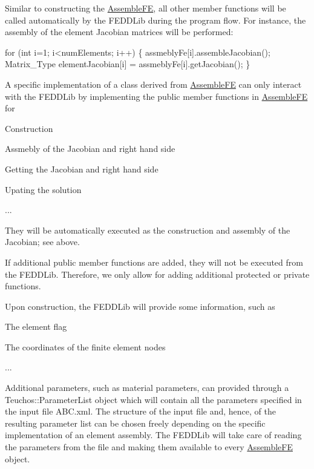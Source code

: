Similar to constructing the \hyperlink{classFEDD_1_1AssembleFE}{Assemble\+FE}, all other member functions will be called automatically by the F\+E\+D\+D\+Lib during the program flow. For instance, the assembly of the element Jacobian matrices will be performed\+: 
\begin{DoxyCode}
\textcolor{keywordflow}{for} (\textcolor{keywordtype}{int} i=1; i<numElements; i++) \{
    assmeblyFe[i].assembleJacobian();
    Matrix\_Type elementJacobian[i] = assmeblyFe[i].getJacobian();
\}
\end{DoxyCode}
 A specific implementation of a class derived from \hyperlink{classFEDD_1_1AssembleFE}{Assemble\+FE} can only interact with the F\+E\+D\+D\+Lib by implementing the public member functions in \hyperlink{classFEDD_1_1AssembleFE}{Assemble\+FE} for
\begin{DoxyItemize}
\item Construction
\item Assmebly of the Jacobian and right hand side
\item Getting the Jacobian and right hand side
\item Upating the solution
\item ...
\end{DoxyItemize}

They will be automatically executed as the construction and assembly of the Jacobian; see above.

If additional public member functions are added, they will not be executed from the F\+E\+D\+D\+Lib. Therefore, we only allow for adding additional protected or private functions.

Upon construction, the F\+E\+D\+D\+Lib will provide some information, such as
\begin{DoxyItemize}
\item The element flag
\item The coordinates of the finite element nodes
\item ...
\end{DoxyItemize}

Additional parameters, such as material parameters, can provided through a Teuchos\+::\+Parameter\+List object which will contain all the parameters specified in the input file {\ttfamily A\+B\+C.\+xml}. The structure of the input file and, hence, of the resulting parameter list can be chosen freely depending on the specific implementation of an element assembly. The F\+E\+D\+D\+Lib will take care of reading the parameters from the file and making them available to every \hyperlink{classFEDD_1_1AssembleFE}{Assemble\+FE} object. 

